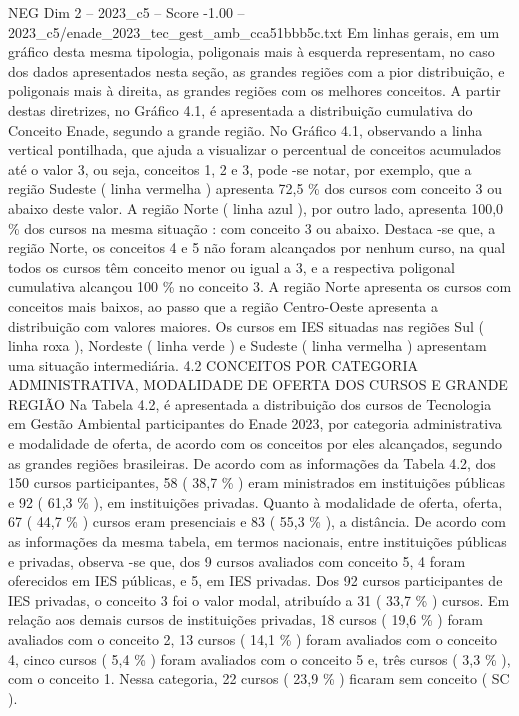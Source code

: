 \begin{textsample}{NEG Dim 2 – 2023\_c5 – Score -1.00 – 2023\_c5/enade\_2023\_tec\_gest\_amb\_cca51bbb5c.txt}
Em linhas gerais, em um gráfico desta mesma tipologia, poligonais mais à esquerda representam, no caso dos dados apresentados nesta seção, as grandes regiões com a pior distribuição, e poligonais mais à direita, as grandes regiões com os melhores conceitos.
A partir destas diretrizes, no Gráfico 4.1, é apresentada a distribuição cumulativa do Conceito Enade, segundo a grande região.
No Gráfico 4.1, observando a linha vertical pontilhada, que ajuda a visualizar o percentual de conceitos acumulados até o valor 3, ou seja, conceitos 1, 2 e 3, pode -se notar, por exemplo, que a região Sudeste ( linha vermelha ) apresenta 72,5 \% dos cursos com conceito 3 ou abaixo deste valor.
A região Norte ( linha azul ), por outro lado, apresenta 100,0 \% dos cursos na mesma situação : com conceito 3 ou abaixo.
Destaca -se que, a região Norte, os conceitos 4 e 5 não foram alcançados por nenhum curso, na qual todos os cursos têm conceito menor ou igual a 3, e a respectiva poligonal cumulativa alcançou 100 \% no conceito 3.
A região Norte apresenta os cursos com conceitos mais baixos, ao passo que a região Centro-Oeste apresenta a distribuição com valores maiores.
Os cursos em IES situadas nas regiões Sul ( linha roxa ), Nordeste ( linha verde ) e Sudeste ( linha vermelha ) apresentam uma situação intermediária. 4.2 CONCEITOS POR CATEGORIA ADMINISTRATIVA, MODALIDADE DE OFERTA DOS CURSOS E GRANDE REGIÃO Na Tabela 4.2, é apresentada a distribuição dos cursos de Tecnologia em Gestão Ambiental participantes do Enade 2023, por categoria administrativa e modalidade de oferta, de acordo com os conceitos por eles alcançados, segundo as grandes regiões brasileiras.
De acordo com as informações da Tabela 4.2, dos 150 cursos participantes, 58 ( 38,7 \% ) eram ministrados em instituições públicas e 92 ( 61,3 \% ), em instituições privadas.
Quanto à modalidade de oferta, oferta, 67 ( 44,7 \% ) cursos eram presenciais e 83 ( 55,3 \% ), a distância.
De acordo com as informações da mesma tabela, em termos nacionais, entre instituições públicas e privadas, observa -se que, dos 9 cursos avaliados com conceito 5, 4 foram oferecidos em IES públicas, e 5, em IES privadas.
Dos 92 cursos participantes de IES privadas, o conceito 3 foi o valor modal, atribuído a 31 ( 33,7 \% ) cursos.
Em relação aos demais cursos de instituições privadas, 18 cursos ( 19,6 \% ) foram avaliados com o conceito 2, 13 cursos ( 14,1 \% ) foram avaliados com o conceito 4, cinco cursos ( 5,4 \% ) foram avaliados com o conceito 5 e, três cursos ( 3,3 \% ), com o conceito 1.
Nessa categoria, 22 cursos ( 23,9 \% ) ficaram sem conceito ( SC ).

\end{textsample}
